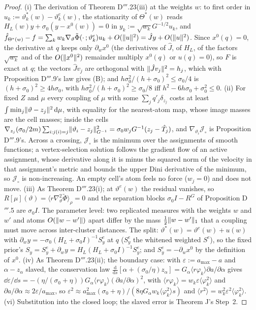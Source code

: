 \begin{proof}
(i) The derivation of Theorem D$'''$.23(iii) at the weights $w$: to first order in
$u_k := \vartheta^*_k(w) - \vartheta^e_k(w)$, the stationarity of $\Theta^*(w)$ reads
$H_L(w)y + \sigma_0(y - x^0(w)) = 0$ in $y_k := \sqrt{w_k}G^{-1/2}u_k$, and
$\hat f_{\Theta^*(w)} - f = \sum_kw_k\nabla_\vartheta\tilde\Phi(\cdot\,;\vartheta^e_k)u_k + O(\lVert u\rVert^2)
= \hat Jy + O(\lVert u\rVert^2)$. Since $x^0(q) = 0$, the derivative at $q$ keeps only $\partial_wx^0$ (the derivatives of
$\hat J$, of $H_L$, of the factors $\sqrt{w_k}$ and of the $O(\lVert x^0\rVert^2)$ remainder multiply $x^0(q)$ or
$u(q) = 0$), so $F$ is exact at $q$; the vectors $\hat Jv_j$ are orthogonal with $\lVert \hat Jv_j\rVert^2 = h_j$, which
with Proposition D$'''$.9's law gives (B); and $h\sigma_0^2/(h + \sigma_0)^2\le\sigma_0/4$ is
$(h + \sigma_0)^2\ge4h\sigma_0$, with $h\sigma_0^2/(h + \sigma_0)^2\ge\sigma_0/8$ iff
$h^2 - 6h\sigma_0 + \sigma_0^2\le0$. (ii) For fixed $Z$ and $\mu$ every coupling of $\mu$ with some
$\sum_jq'_j\delta_{z_j}$ costs at least $\int\min_j\lVert \vartheta - z_j\rVert^2\,\mathrm{d}\mu$, with equality for the
nearest-atom map, whose image masses are the cell masses; inside the cells
$\nabla_{z_j}(\sigma_0/2m)\sum_{i:j(i)=j}\lVert \vartheta_i - z_j\rVert^2_{G^{-1}} = \sigma_0w_jG^{-1}(z_j - \hat T_j)$, and
$\nabla_{\vartheta_i}\mathcal{J}_\circ$ is Proposition D$'''$.9's. Across a crossing, $\mathcal{J}_\circ$ is the
minimum over the assignments of smooth functions; a vertex-selection solution follows the gradient flow of an active
assignment, whose derivative along it is minus the squared norm of the velocity in that assignment's metric and
bounds the upper Dini derivative of the minimum, so $\mathcal{J}_\circ$ is non-increasing. An empty cell's atom
feels no force ($w_j = 0$) and does not move. (iii) As Theorem D$'''$.23(i); at $\vartheta^e(w)$ the residual
vanishes, so $R[\mu](\vartheta) = \langle r\nabla^2_\vartheta\tilde\Phi\rangle_\rho = 0$ and the separation blocks
$\sigma_0I - R^G$ of Proposition D$'''$.5 are $\sigma_0I$. The parameter level: two replicated measures with the
weights $w$ and $w'$ and atoms $O(\lVert w - w'\rVert)$ apart differ by the mass $\frac12\lVert w - w'\rVert_1$ that a coupling
must move across inter-cluster distances. The split: $\vartheta^*(w) = \vartheta^e(w) + u(w)$ with
$\partial_wy = -\sigma_0(H_L + \sigma_0I)^{-1}S^e_y$ at $q$ ($S^e_y$ the whitened weighted $S^e$), so the fixed
prior's $S_y = S^e_y + \partial_wy = H_L(H_L + \sigma_0I)^{-1}S^e_y$; and $S^e_y = -\partial_wx^0$ by the definition
of $x^0$. (iv) As Theorem D$'''$.23(ii); the boundary case: with $\varepsilon := a_{\max} - a$ and
$\alpha - z_\alpha$ slaved, the conservation law
$\frac{\mathrm{d}}{\mathrm{d}s}[\alpha + (\sigma_0/\eta)z_\alpha]
= G_\alpha\langle r\varphi_k\rangle\partial a/\partial\alpha$ gives
$\dd\varepsilon/\dd s = -(\eta/(\sigma_0 + \eta))G_\alpha\langle r\varphi_k\rangle(\partial a/\partial\alpha)^2$, with
$\langle r\varphi_k\rangle = w_k\varepsilon\langle\varphi_k^2\rangle$ and
$\partial a/\partial\alpha\approx2\varepsilon/a_{\max}$, so
$\varepsilon^2\approx a_{\max}^2(\sigma_0 + \eta)/(8\eta G_\alpha w_k\langle\varphi_k^2\rangle s)$ and
$\langle r^2\rangle = w_k^2\varepsilon^2\langle\varphi_k^2\rangle$. (vi) Substitution into the closed loop; the
slaved error is Theorem J's Step~2.
\end{proof}
